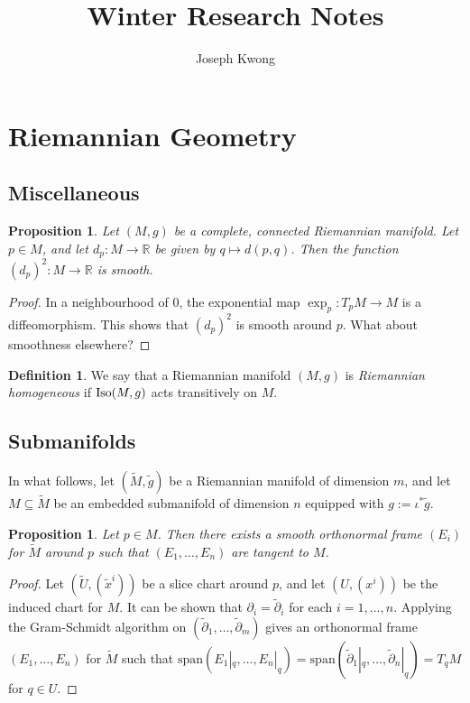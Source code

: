 \documentclass{amsart}[]
\title{Winter Research Notes}
\author{Joseph Kwong}
\newcommand{\R}{\mathbb R}
\newcommand{\alert}[1]{\color{red}#1\color{black}}
\newcommand{\iso}{\text{\normalfont Iso}}
\theoremstyle{plain}
\newtheorem{proposition}[theorem]{Proposition}
\theoremstyle{definition}
\newtheorem{definition}[theorem]{Definition}
\theoremstyle{remark}
\begin{document}
	\maketitle
\section{Riemannian Geometry}
	\subsection{Miscellaneous}
	\begin{proposition}
		Let $(M,g)$ be a complete, connected Riemannian manifold. Let $p \in M$, and let $d_p:M \rightarrow \R$ be given by $q \mapsto d(p,q)$. Then the function $(d_p)^2:M \rightarrow \R$ is smooth.
	\end{proposition}
	\begin{proof}
		\alert{In a neighbourhood of $0$, the exponential map $\exp_p:T_p M \rightarrow M$ is a diffeomorphism. This shows that $(d_p)^2$ is smooth around $p$. What about smoothness elsewhere?}
	\end{proof}

	\begin{definition}
		We say that a Riemannian manifold $(M,g)$ is \emph{Riemannian homogeneous} if $\iso(M,g)$ acts transitively on $M$.
	\end{definition}

	\subsection{Submanifolds} In what follows, let $(\widetilde M, \widetilde g)$ be a Riemannian manifold of dimension $m$, and let $M \subseteq \widetilde M$ be an embedded submanifold of dimension $n$ equipped with $g := \iota^* \widetilde g$.
	\begin{proposition}
		Let $p \in M$. Then there exists a smooth orthonormal frame $(E_i)$ for $\widetilde M$ around $p$ such that $(E_1,\ldots,E_n)$ are tangent to $M$.
	\end{proposition}
	\begin{proof}
		Let $(\widetilde U, (\widetilde x^i))$ be a slice chart around $p$, and let $(U,(x^i))$ be the induced chart for $M$. It can be shown that $\partial_i = \widetilde \partial_i$ for each $i = 1,\ldots,n$. Applying the Gram-Schmidt algorithm on $(\widetilde \partial_1,\ldots,\widetilde \partial_m)$ gives an orthonormal frame $(E_1,\ldots,E_n)$ for $\widetilde M$ such that 
		$\mathrm{span}(E_1|_q,\ldots,E_n|_q) = \mathrm{span}(\widetilde \partial_1|_q,\ldots, \widetilde\partial_n|_q) = T_q M$ for $q \in U$.
	\end{proof}
\end{document}
